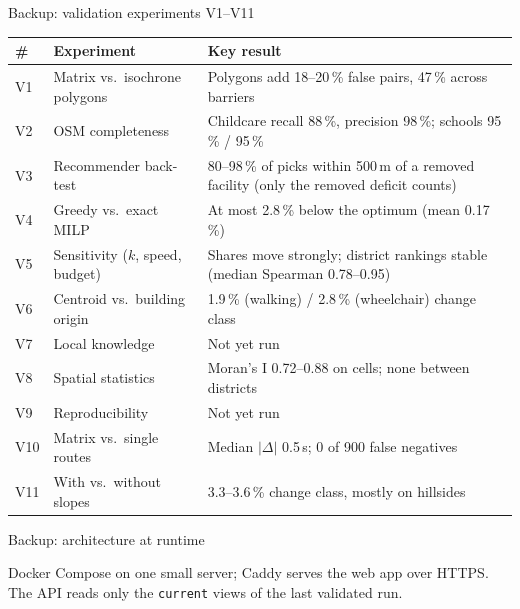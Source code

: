 \documentclass[aspectratio=169,10pt]{beamer}
\begin{document}
\begin{frame}{Backup: validation experiments V1--V11}
  \scriptsize
  \begin{tabular}{@{}llp{95mm}@{}}
    \toprule
    \# & Experiment & Key result \\
    \midrule
    V1 & Matrix vs.\ isochrone polygons & Polygons add 18--20\,\% false pairs, 47\,\% across barriers \\
    V2 & OSM completeness & Childcare recall 88\,\%, precision 98\,\%; schools 95\,\% / 95\,\% \\
    V3 & Recommender back-test & 80--98\,\% of picks within 500\,m of a removed facility (only the removed deficit counts) \\
    V4 & Greedy vs.\ exact MILP & At most 2.8\,\% below the optimum (mean 0.17\,\%) \\
    V5 & Sensitivity ($k$, speed, budget) & Shares move strongly; district rankings stable
      (median Spearman 0.78--0.95) \\
    V6 & Centroid vs.\ building origin & 1.9\,\% (walking) / 2.8\,\% (wheelchair) change class \\
    V7 & Local knowledge & Not yet run \\
    V8 & Spatial statistics & Moran's I 0.72--0.88 on cells; none between districts \\
    V9 & Reproducibility & Not yet run \\
    V10 & Matrix vs.\ single routes & Median $|\Delta|$ 0.5\,s; 0 of 900 false negatives \\
    V11 & With vs.\ without slopes & 3.3--3.6\,\% change class, mostly on hillsides \\
    \bottomrule
  \end{tabular}
\end{frame}

\begin{frame}{Backup: architecture at runtime}
  \vspace{10mm}
  \centering\architecturefigure\par
  \vspace{10mm}
  \footnotesize Docker Compose on one small server; Caddy serves the web app over HTTPS. The API
  reads only the \texttt{current} views of the last validated run.
\end{frame}
\end{document}
